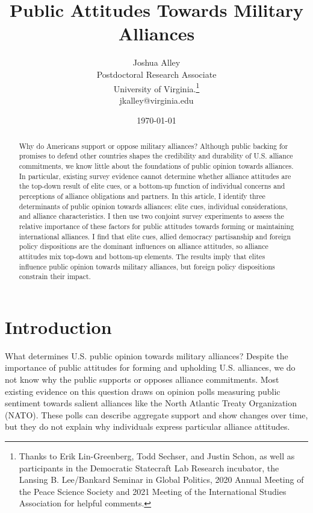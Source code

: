\documentclass[12pt]{article}
\title{\textbf{Public Attitudes Towards Military Alliances}}
\author{Joshua Alley \\
Postdoctoral Research Associate \\
University of Virginia.\thanks{Thanks to Erik Lin-Greenberg, Todd Sechser, and Justin Schon, as well as participants in the Democratic Statecraft Lab Research incubator, the Lansing B. Lee/Bankard Seminar in Global Politics, 2020 Annual Meeting of the Peace Science Society and 2021 Meeting of the International Studies Association for helpful comments.} \\
jkalley@virginia.edu
}
\date{\today}
\begin{document}
\maketitle 

\doublespace 

\begin{abstract}
Why do Americans support or oppose military alliances? 
Although public backing for promises to defend other countries shapes the credibility and durability of U.S. alliance commitments, we know little about the foundations of public opinion towards alliances.
In particular, existing survey evidence cannot determine whether alliance attitudes are the top-down result of elite cues, or a bottom-up function of individual concerns and perceptions of alliance obligations and partners. 
In this article, I identify three determinants of public opinion towards alliances: elite cues, individual considerations, and alliance characteristics. 
I then use two conjoint survey experiments to assess the relative importance of these factors for public attitudes towards forming or maintaining international alliances.  
I find that elite cues, allied democracy partisanship and foreign policy dispositions are the dominant influences on alliance attitudes, so alliance attitudes mix top-down and bottom-up elements.
The results imply that elites influence public opinion towards military alliances, but foreign policy dispositions constrain their impact.  
\end{abstract}


\newpage 


\section{Introduction}

What determines U.S. public opinion towards military alliances? 
Despite the importance of public attitudes for forming and upholding U.S. alliances, we do not know why the public supports or opposes alliance commitments. 
Most existing evidence on this question draws on opinion polls measuring public sentiment towards salient alliances like the North Atlantic Treaty Organization (NATO).
These polls can describe aggregate support and show changes over time, but they do not explain why individuals express particular alliance attitudes. 
\end{document}
